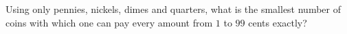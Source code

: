 Using only pennies, nickels, dimes and quarters, what is the smallest number of coins with which one can pay every amount from $1$ to $99$ cents exactly?
